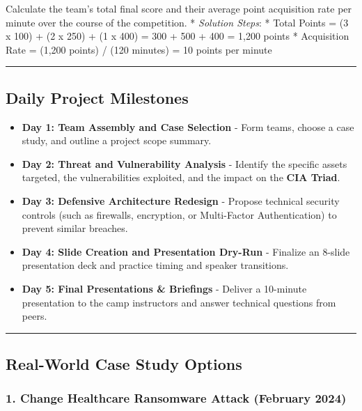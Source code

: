 \documentclass[12pt,openany]{book}
\begin{document}
Calculate the team's total final score and their average point acquisition rate per minute over the course of the competition.
* \textit{Solution Steps}:
    * Total Points = (3 x 100) + (2 x 250) + (1 x 400) = 300 + 500 + 400 = 1,200 points
    * Acquisition Rate = (1,200 points) / (120 minutes) = 10 points per minute


\medskip\noindent\rule{\linewidth}{0.4pt}\medskip

\medskip

\subsection*{Daily Project Milestones}


\begin{itemize}

  \item \textbf{Day 1: Team Assembly and Case Selection} - Form teams, choose a case study, and outline a project scope summary.

  \item \textbf{Day 2: Threat and Vulnerability Analysis} - Identify the specific assets targeted, the vulnerabilities exploited, and the impact on the \textbf{CIA Triad}.

  \item \textbf{Day 3: Defensive Architecture Redesign} - Propose technical security controls (such as firewalls, encryption, or Multi-Factor Authentication) to prevent similar breaches.

  \item \textbf{Day 4: Slide Creation and Presentation Dry-Run} - Finalize an 8-slide presentation deck and practice timing and speaker transitions.

  \item \textbf{Day 5: Final Presentations \& Briefings} - Deliver a 10-minute presentation to the camp instructors and answer technical questions from peers.

\end{itemize}


\medskip\noindent\rule{\linewidth}{0.4pt}\medskip

\medskip

\subsection*{Real-World Case Study Options}


\subsubsection*{1. Change Healthcare Ransomware Attack (February 2024)}
\end{document}
